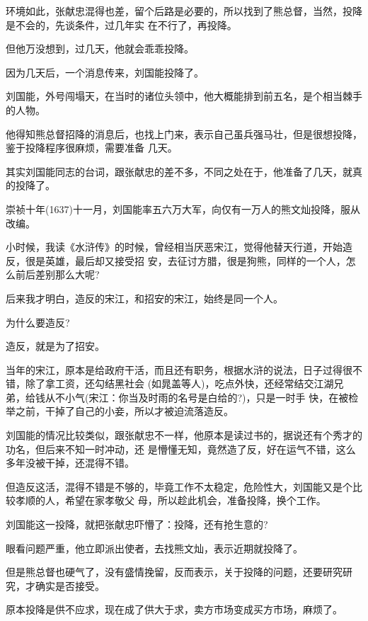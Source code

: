 \documentclass[11pt,a4paper,onecolumn]{article}
\begin{document}
环境如此，张献忠混得也差，留个后路是必要的，所以找到了熊总督，当然，投降是不会的，先谈条件，过几年实
在不行了，再投降。

但他万没想到，过几天，他就会乖乖投降。

因为几天后，一个消息传来，刘国能投降了。

刘国能，外号闯塌天，在当时的诸位头领中，他大概能排到前五名，是个相当棘手的人物。

他得知熊总督招降的消息后，也找上门来，表示自己虽兵强马壮，但是很想投降，鉴于投降程序很麻烦，需要准备
几天。

其实刘国能同志的台词，跟张献忠的差不多，不同之处在于，他准备了几天，就真的投降了。

崇祯十年(1637)十一月，刘国能率五六万大军，向仅有一万人的熊文灿投降，服从改编。

小时候，我读《水浒传》的时候，曾经相当厌恶宋江，觉得他替天行道，开始造反，很是英雄，最后却又接受招
安，去征讨方腊，很是狗熊，同样的一个人，怎么前后差别那么大呢?

后来我才明白，造反的宋江，和招安的宋江，始终是同一个人。

为什么要造反?

造反，就是为了招安。

当年的宋江，原本是给政府干活，而且还有职务，根据水浒的说法，日子过得很不错，除了拿工资，还勾结黑社会
(如晁盖等人)，吃点外快，还经常结交江湖兄弟，给钱从不小气(宋江：你当及时雨的名号是白给的?)，只是一时手
快，在被检举之前，干掉了自己的小妾，所以才被迫流落造反。

刘国能的情况比较类似，跟张献忠不一样，他原本是读过书的，据说还有个秀才的功名，但后来不知一时冲动，还
是懵懂无知，竟然造了反，好在运气不错，这么多年没被干掉，还混得不错。

但造反这活，混得不错是不够的，毕竟工作不太稳定，危险性大，刘国能又是个比较孝顺的人，希望在家孝敬父
母，所以趁此机会，准备投降，换个工作。

刘国能这一投降，就把张献忠吓懵了：投降，还有抢生意的?

眼看问题严重，他立即派出使者，去找熊文灿，表示近期就投降了。

但是熊总督也硬气了，没有盛情挽留，反而表示，关于投降的问题，还要研究研究，才确实是否接受。

原本投降是供不应求，现在成了供大于求，卖方市场变成买方市场，麻烦了。

\section[\thesection]{}
\end{document}

